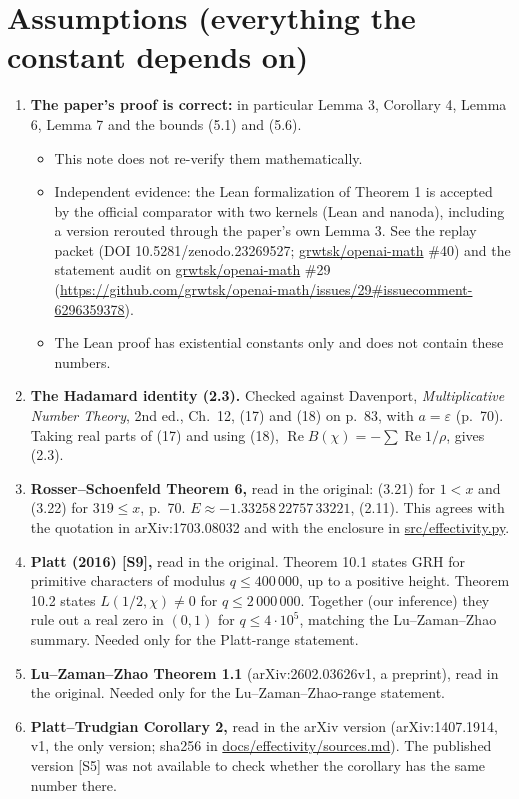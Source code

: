 \documentclass[11pt]{article}
\newcommand{\Rea}{\operatorname{Re}}
\begin{document}
\section{Assumptions (everything the constant depends on)}\label{sec:assumptions}

\begin{enumerate}
\item \textbf{The paper's proof is correct:} in particular Lemma 3, Corollary 4, Lemma 6, Lemma 7 and the bounds (5.1) and (5.6).
  \begin{itemize}
  \item This note does not re-verify them mathematically.
  \item Independent evidence: the Lean formalization of Theorem 1 is accepted by the official comparator with two kernels (Lean and nanoda), including a version rerouted through the paper's own Lemma 3. See the replay packet (DOI 10.5281/zenodo.23269527; \url{grwtsk/openai-math} \#40) and the statement audit on \url{grwtsk/openai-math} \#29 (\url{https://github.com/grwtsk/openai-math/issues/29#issuecomment-6296359378}).
  \item The Lean proof has existential constants only and does not contain these numbers.
  \end{itemize}
\item \textbf{The Hadamard identity (2.3).} Checked against Davenport, \emph{Multiplicative Number Theory}, 2nd ed., Ch.~12, (17) and (18) on p.~83, with $a=\varepsilon$ (p.~70). Taking real parts of (17) and using (18), $\Rea B(\chi) = -\sum\Rea 1/\rho$, gives (2.3).
\item \textbf{Rosser--Schoenfeld Theorem 6,} read in the original: (3.21) for $1<x$ and (3.22) for $319\le x$, p.~70. $E\approx-1.33258\,22757\,33221$, (2.11). This agrees with the quotation in arXiv:1703.08032 and with the enclosure in \url{src/effectivity.py}.
\item \textbf{Platt (2016) [S9],} read in the original. Theorem 10.1 states GRH for primitive characters of modulus $q\le 400\,000$, up to a positive height. Theorem 10.2 states $L(1/2,\chi)\ne0$ for $q\le 2\,000\,000$. Together (our inference) they rule out a real zero in $(0,1)$ for $q\le4\cdot10^5$, matching the Lu--Zaman--Zhao summary. Needed only for the Platt-range statement.
\item \textbf{Lu--Zaman--Zhao Theorem 1.1} (arXiv:2602.03626v1, a preprint), read in the original. Needed only for the Lu--Zaman--Zhao-range statement.
\item \textbf{Platt--Trudgian Corollary 2,} read in the arXiv version (arXiv:1407.1914, v1, the only version; sha256 in \url{docs/effectivity/sources.md}). The published version [S5] was not available to check whether the corollary has the same number there.

\end{enumerate}
\end{document}
